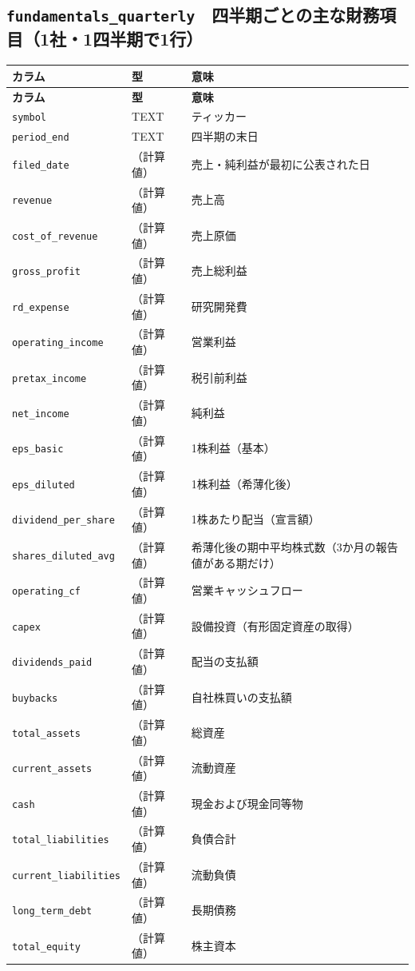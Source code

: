 \documentclass[xelatex,ja=standard,jafont=hiragino-pron,a4paper,10pt]{bxjsreport}
\begin{document}
\subsection*{\texttt{fundamentals\_\allowbreak{}quarterly}　四半期ごとの主な財務項目（1社・1四半期で1行）}
{\footnotesize
\begin{longtable}{p{3.60cm}p{1.80cm}p{8.90cm}}
\toprule
\textbf{カラム} & \textbf{型} & \textbf{意味} \\
\midrule
\endfirsthead
\toprule
\textbf{カラム} & \textbf{型} & \textbf{意味} \\
\midrule
\endhead
\bottomrule
\endfoot
\texttt{symbol} & TEXT & ティッカー \\
\texttt{period\_\allowbreak{}end} & TEXT & 四半期の末日 \\
\texttt{filed\_\allowbreak{}date} & （計算値） & 売上・純利益が最初に公表された日 \\
\texttt{revenue} & （計算値） & 売上高 \\
\texttt{cost\_\allowbreak{}of\_\allowbreak{}revenue} & （計算値） & 売上原価 \\
\texttt{gross\_\allowbreak{}profit} & （計算値） & 売上総利益 \\
\texttt{rd\_\allowbreak{}expense} & （計算値） & 研究開発費 \\
\texttt{operating\_\allowbreak{}income} & （計算値） & 営業利益 \\
\texttt{pretax\_\allowbreak{}income} & （計算値） & 税引前利益 \\
\texttt{net\_\allowbreak{}income} & （計算値） & 純利益 \\
\texttt{eps\_\allowbreak{}basic} & （計算値） & 1株利益（基本） \\
\texttt{eps\_\allowbreak{}diluted} & （計算値） & 1株利益（希薄化後） \\
\texttt{dividend\_\allowbreak{}per\_\allowbreak{}share} & （計算値） & 1株あたり配当（宣言額） \\
\texttt{shares\_\allowbreak{}diluted\_\allowbreak{}avg} & （計算値） & 希薄化後の期中平均株式数（3か月の報告値がある期だけ） \\
\texttt{operating\_\allowbreak{}cf} & （計算値） & 営業キャッシュフロー \\
\texttt{capex} & （計算値） & 設備投資（有形固定資産の取得） \\
\texttt{dividends\_\allowbreak{}paid} & （計算値） & 配当の支払額 \\
\texttt{buybacks} & （計算値） & 自社株買いの支払額 \\
\texttt{total\_\allowbreak{}assets} & （計算値） & 総資産 \\
\texttt{current\_\allowbreak{}assets} & （計算値） & 流動資産 \\
\texttt{cash} & （計算値） & 現金および現金同等物 \\
\texttt{total\_\allowbreak{}liabilities} & （計算値） & 負債合計 \\
\texttt{current\_\allowbreak{}liabilities} & （計算値） & 流動負債 \\
\texttt{long\_\allowbreak{}term\_\allowbreak{}debt} & （計算値） & 長期債務 \\
\texttt{total\_\allowbreak{}equity} & （計算値） & 株主資本 \\
\end{longtable}
}
\end{document}
